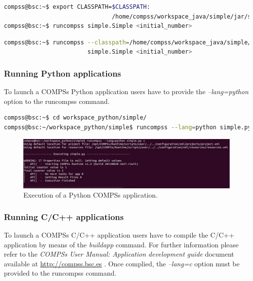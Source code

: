 \begin{lstlisting}[language=bash]
compss@bsc:~$ export CLASSPATH=$CLASSPATH:
                               /home/compss/workspace_java/simple/jar/simple.jar
compss@bsc:~$ runcompss simple.Simple <initial_number>
\end{lstlisting}

\begin{lstlisting}[language=bash]
compss@bsc:~$ runcompss --classpath=/home/compss/workspace_java/simple/jar/simple.jar 
                        simple.Simple <initial_number>
\end{lstlisting}


\subsubsection{Running Python applications}
To launch a COMPSs Python application users have to provide the \textit{--lang=python} option to the runcompss command. 

\begin{lstlisting}[language=bash]
compss@bsc:~$ cd workspace_python/simple/
compss@bsc:~/workspace_python/simple$ runcompss --lang=python simple.py <initial_number>
\end{lstlisting}

\begin{figure}[h!]
  \centering
    \includegraphics[width=\textwidth]{./Sections/2_Execution/Figures/python_execution.jpeg}
    \caption{Execution of a Python COMPSs application.}
    \label{fig:python_execution}
\end{figure}
\vspace{-0.4cm}


\subsubsection{Running C/C++ applications}
To launch a COMPSs C/C++ application users have to compile the C/C++ application by means of the \textit{buildapp} command. For 
further information please refer to the \textit{COMPSs User Manual: Application development guide} document available at \url{http://compss.bsc.es} . Once complied, 
the \textit{--lang=c} option must be provided to the runcompss command.

